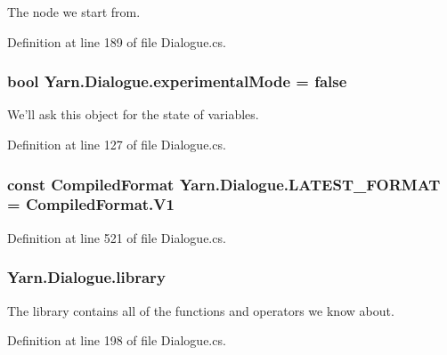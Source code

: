 The node we start from. 



Definition at line 189 of file Dialogue.\-cs.

\hypertarget{a00082_a2a5ac23441861eef13c59044cc218f09}{
\subsubsection[{experimental\-Mode}]{\setlength{\rightskip}{0pt plus 5cm}bool Yarn.\-Dialogue.\-experimental\-Mode = false}}\label{a00082_a2a5ac23441861eef13c59044cc218f09}


We'll ask this object for the state of variables. 



Definition at line 127 of file Dialogue.\-cs.

\hypertarget{a00082_a3bc83587462ade6a2f7f42cb7576e50e}{
\subsubsection[{L\-A\-T\-E\-S\-T\-\_\-\-F\-O\-R\-M\-A\-T}]{\setlength{\rightskip}{0pt plus 5cm}const {\bf Compiled\-Format} Yarn.\-Dialogue.\-L\-A\-T\-E\-S\-T\-\_\-\-F\-O\-R\-M\-A\-T = Compiled\-Format.\-V1}}\label{a00082_a3bc83587462ade6a2f7f42cb7576e50e}


Definition at line 521 of file Dialogue.\-cs.

\hypertarget{a00082_ae660d4cfb6e296358d2f61d8ee74c66a}{
\subsubsection[{library}]{ Yarn.\-Dialogue.\-library}}\label{a00082_ae660d4cfb6e296358d2f61d8ee74c66a}


The library contains all of the functions and operators we know about. 



Definition at line 198 of file Dialogue.\-cs.



